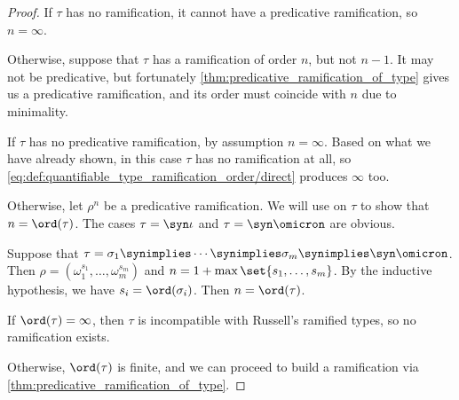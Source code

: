 \begin{proof}
   If \( \tau \) has no ramification, it cannot have a predicative ramification, so \( n = \infty \).

  Otherwise, suppose that \( \tau \) has a ramification of order \( n \), but not \( n - 1 \). It may not be predicative, but fortunately \cref{thm:predicative_ramification_of_type} gives us a predicative ramification, and its order must coincide with \( n \) due to minimality.

   If \( \tau \) has no predicative ramification, by assumption \( n = \infty \). Based on what we have already shown, in this case \( \tau \) has no ramification at all, so \eqref{eq:def:quantifiable_type_ramification_order/direct} produces \( \infty \) too.

  Otherwise, let \( \rho^n \) be a predicative ramification. We will use  on \( \tau \) to show that \( n = \ord(\tau) \). The cases \( \tau = \syn\iota \) and \( \tau = \syn\omicron \) are obvious.

  Suppose that \( \tau = \sigma_1 \synimplies \cdots \synimplies \sigma_m \synimplies \syn\omicron \). Then \( \rho = (\omega_1^{s_1}, \ldots, \omega_m^{s_m}) \) and \( n = 1 + \max\set{ s_1, \ldots, s_m } \). By the inductive hypothesis, we have \( s_i = \ord(\sigma_i) \). Then \( n = \ord(\tau) \).

   If \( \ord(\tau) = \infty \), then \( \tau \) is incompatible with Russell's ramified types, so no ramification exists.

  Otherwise, \( \ord(\tau) \) is finite, and we can proceed to build a ramification via \cref{thm:predicative_ramification_of_type}.
\end{proof}

